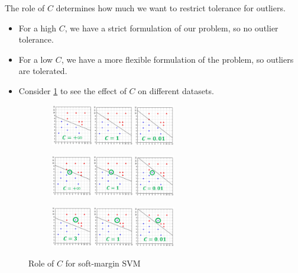 The role of $C$ determines how much we want to restrict tolerance for outliers. 
\begin{itemize}
  \item For a high $C$, we have a strict formulation of our problem, so no outlier tolerance.
  \item For a low $C$, we have a more flexible formulation of the problem, so outliers are tolerated.
  \item Consider \ref{fig:5_c} to see the effect of $C$ on different datasets.
\end{itemize}

\begin{figure}[H]
  \centering
  \begin{subfigure}{\textwidth}
    \centering
    \includegraphics[width=0.6\textwidth]{assets/svm/sm__c_separable.png}
  \end{subfigure}

  \vspace*{0.5cm}

  \begin{subfigure}{\textwidth}
    \centering
    \includegraphics[width=0.6\textwidth]{assets/svm/sm__c_1_outlier.png}
  \end{subfigure}

  \vspace*{0.5cm}

  \begin{subfigure}{\textwidth}
    \centering
    \includegraphics[width=0.6\textwidth]{assets/svm/sm__c_not_separable.png}
  \end{subfigure}

  \caption{Role of $C$ for soft-margin SVM}
  \label{fig:5_c}
\end{figure}